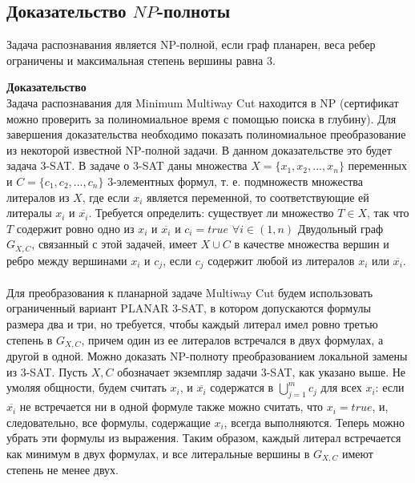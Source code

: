 \subsection{Доказательство \(NP\)-полноты}
\begin{theorem}
Задача распознавания является NP-полной, если граф планарен, веса ребер
ограничены и максимальная степень вершины равна 3.
\end{theorem}
\textbf{Доказательство}
\\Задача распознавания для Minimum Multiway Cut находится в NP (сертификат можно проверить за полиномиальное время с помощью поиска в глубину). Для завершения доказательства необходимо показать полиномиальное преобразование из некоторой известной NP-полной задачи. В данном доказательстве это будет задача 3-SAT.
В задаче о 3-SAT даны множества \(X=\{x_1, x_2,...,x_n\}\) переменных и \(C=\{c_1, c_2,...,c_n\}\) 3-элементных формул, т. е. подмножеств множества литералов из \(X\), где если \(x_i\) является переменной, то соответствующие ей литералы \(x_i\) и \(\overline{x_i}\). Требуется определить: 
существует ли множество \(T \in X\), так что \(T\) содержит ровно одно из \(x_i\) и \(\overline{x_i}\) и \(c_i=true\) \(\forall{i\in (1, n)}\)  
Двудольный граф \(G_{X,C}\), связанный с этой задачей, имеет \(X\cup C\) в качестве множества вершин и ребро между вершинами \(x_i\) и \(c_j\), если \(c_j\) содержит любой из литералов \(x_i\) или \(\overline{x_i}\).
\\
\\Для преобразования к планарной задаче Multiway Cut  будем использовать ограниченный
вариант PLANAR 3-SAT, в котором допускаются формулы размера два и три, но
требуется, чтобы каждый литерал имел ровно третью степень в \(G_{X,C}\), причем один из ее литералов встречался в двух формулах, а другой в одной. Можно доказать NP-полноту преобразованием локальной замены из 3-SAT. Пусть \(X,C\) обозначает экземпляр задачи 3-SAT, как указано выше. Не умоляя общности, будем считать \(x_i\), и \(\overline{x_i}\) содержатся в \(\bigcup_{j=1}^{m}c_j\) для всех \(x_i\): если \(\overline{x_i}\) не встречается ни в одной формуле также можно считать, что \(x_i=true\), и, следовательно,
все формулы, содержащие \(x_i\), всегда выполняются. Теперь можно убрать эти формулы из выражения. Таким образом, каждый
литерал встречается как минимум в двух формулах, и все литеральные вершины в \(G_{X,C}\) имеют степень не менее двух.

